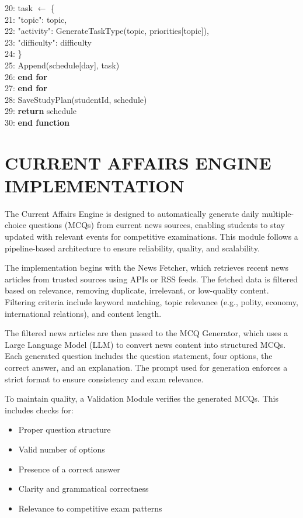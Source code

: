 \begin{sloppypar}
20: \qquad\quad task $\leftarrow$ \{\\
21: \qquad\qquad "topic": topic,\\
22: \qquad\qquad "activity": GenerateTaskType(topic, priorities[topic]),\\
23: \qquad\qquad "difficulty": difficulty\\
24: \qquad\quad \}\\
25: \qquad\quad Append(schedule[day], task)\\
26: \qquad \textbf{\textbf{end for}}\\
27: \quad \textbf{\textbf{end for}}\\
28: \quad SaveStudyPlan(studentId, schedule)\\
29: \quad \textbf{return} schedule\\
30: \textbf{end function}
\algofooter

\section{\MakeUppercase{CURRENT AFFAIRS ENGINE IMPLEMENTATION}}

The Current Affairs Engine is designed to automatically generate daily multiple-choice questions (MCQs) from current news sources, enabling students to stay updated with relevant events for competitive examinations. This module follows a pipeline-based architecture to ensure reliability, quality, and scalability.

The implementation begins with the News Fetcher, which retrieves recent news articles from trusted sources using APIs or RSS feeds. The fetched data is filtered based on relevance, removing duplicate, irrelevant, or low-quality content. Filtering criteria include keyword matching, topic relevance (e.g., polity, economy, international relations), and content length.

The filtered news articles are then passed to the MCQ Generator, which uses a Large Language Model (LLM) to convert news content into structured MCQs. Each generated question includes the question statement, four options, the correct answer, and an explanation. The prompt used for generation enforces a strict format to ensure consistency and exam relevance.

To maintain quality, a Validation Module verifies the generated MCQs. This includes checks for:

\begin{itemize}
\item Proper question structure
\item Valid number of options
\item Presence of a correct answer
\item Clarity and grammatical correctness
\item Relevance to competitive exam patterns
\end{itemize}


\end{sloppypar}
